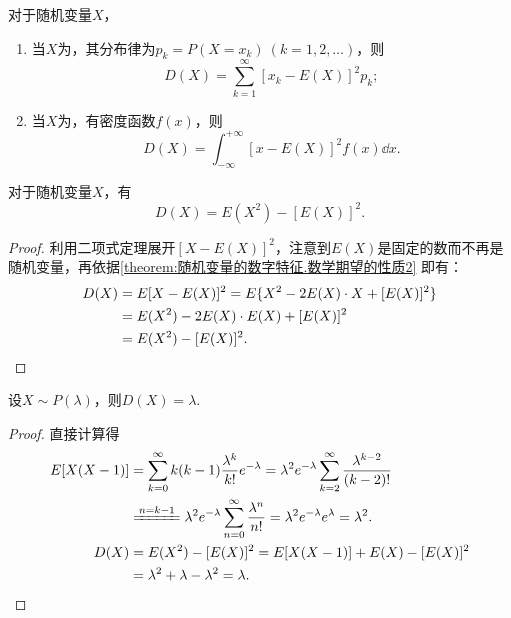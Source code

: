 \begin{theorem}
对于随机变量\(X\)，
\begin{enumerate}
\item 当\(X\)为，其分布律为\(p_k = P(X=x_k)\ (k=1,2,\dotsc)\)，则\[
D(X) = \sum_{k=1}^\infty [x_k - E(X)]^2 p_k;
\]
\item 当\(X\)为，有密度函数\(f(x)\)，则\[
D(X) = \int_{-\infty}^{+\infty} [x - E(X)]^2 f(x) \dd{x}.
\]
\end{enumerate}
\end{theorem}

\begin{corollary}\label{theorem:随机变量的数字特征.常用的方差的计算式}
对于随机变量\(X\)，有\begin{equation}
D(X) = E(X^2) - [E(X)]^2.
\end{equation}
\begin{proof}
利用二项式定理展开\([X-E(X)]^2\)，注意到\(E(X)\)是固定的数而不再是随机变量，再依据\cref{theorem:随机变量的数字特征.数学期望的性质2} 即有：
\begin{align*}
D(X) &= E[X-E(X)]^2
= E\{X^2 - 2E(X) \cdot X + [E(X)]^2\} \\
&= E(X^2) - 2E(X) \cdot E(X) + [E(X)]^2 \\
&= E(X^2) - [E(X)]^2.
\qedhere
\end{align*}
\end{proof}
\end{corollary}

\begin{theorem}
设\(X \sim P(\lambda)\)，则\(D(X) = \lambda\).
\begin{proof}
直接计算得
\begin{align*}
E[X(X-1)]
&= \sum_{k=0}^\infty {k(k-1) \frac{\lambda^k}{k!} e^{-\lambda}}
= \lambda^2 e^{-\lambda} \sum_{k=2}^\infty {\frac{\lambda^{k-2}}{(k-2)!}} \\
&\xlongequal{n=k-1} \lambda^2 e^{-\lambda} \sum_{n=0}^\infty {\frac{\lambda^n}{n!}}
= \lambda^2 e^{-\lambda} e^\lambda = \lambda^2. \\
D(X)
&= E(X^2) - [E(X)]^2
= E[X(X-1)] + E(X) - [E(X)]^2 \\
&= \lambda^2 + \lambda - \lambda^2 = \lambda.
\qedhere
\end{align*}
\end{proof}
\end{theorem}

